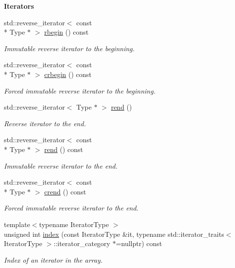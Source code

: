 \begin{Indent}{\bf Iterators}
\begin{DoxyCompactItemize}
std\-::reverse\-\_\-iterator$<$ const \\*
Type $\ast$ $>$ \hyperlink{classmagrathea_1_1AbstractNArray_a8eb27b3bb2ed735aa1ef68d3a5f081ba}{rbegin} () const 
\begin{DoxyCompactList}\small\item\em Immutable reverse iterator to the beginning. \end{DoxyCompactList}\item 
std\-::reverse\-\_\-iterator$<$ const \\*
Type $\ast$ $>$ \hyperlink{classmagrathea_1_1AbstractNArray_a37c7da2dfedecf54aba5fc6592c9165c}{crbegin} () const 
\begin{DoxyCompactList}\small\item\em Forced immutable reverse iterator to the beginning. \end{DoxyCompactList}\item 
std\-::reverse\-\_\-iterator$<$ Type $\ast$ $>$ \hyperlink{classmagrathea_1_1AbstractNArray_a8fb3024caf7a7151aa3c43d19d195d1b}{rend} ()
\begin{DoxyCompactList}\small\item\em Reverse iterator to the end. \end{DoxyCompactList}\item 
std\-::reverse\-\_\-iterator$<$ const \\*
Type $\ast$ $>$ \hyperlink{classmagrathea_1_1AbstractNArray_a8761e168c2a4b03d363f4581b3db4bf2}{rend} () const 
\begin{DoxyCompactList}\small\item\em Immutable reverse iterator to the end. \end{DoxyCompactList}\item 
std\-::reverse\-\_\-iterator$<$ const \\*
Type $\ast$ $>$ \hyperlink{classmagrathea_1_1AbstractNArray_a84ab575343099c09997d2bb903d4b7f4}{crend} () const 
\begin{DoxyCompactList}\small\item\em Forced immutable reverse iterator to the end. \end{DoxyCompactList}\item 
{\footnotesize template$<$typename Iterator\-Type $>$ }\\unsigned int \hyperlink{classmagrathea_1_1AbstractNArray_a36e332beb5a644e884423077307cc5b9}{index} (const Iterator\-Type \&it, typename std\-::iterator\-\_\-traits$<$ Iterator\-Type $>$\-::iterator\-\_\-category $\ast$=nullptr) const 
\begin{DoxyCompactList}\small\item\em Index of an iterator in the array. \end{DoxyCompactList}\end{DoxyCompactItemize}
\end{Indent}
